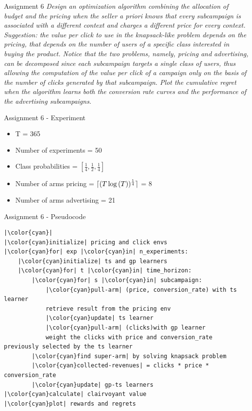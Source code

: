 \documentclass[11pt]{beamer}
\DeclarePairedDelimiter{\ceil}{\lceil}{\rceil}
\begin{document}
\begin{frame}{Assignment 6}
\textit{Design an optimization algorithm combining the allocation of budget and the pricing when the seller a priori knows that every subcampaign is associated with a different context and charges a different price for every context. Suggestion: the value per click to use in the knapsack-like problem depends on the pricing, that depends on the number of users of a specific class interested in buying the product. Notice that the two problems, namely, pricing and advertising, can be decomposed since each subcampaign targets a single class of users, thus allowing the computation of the value per click of a campaign only on the basis of the number of clicks generated by that subcampaign. Plot the cumulative regret when the algorithm learns both the conversion rate curves and the performance of the advertising subcampaigns.}
\end{frame}

\begin{frame}{Assignment 6 - Experiment}
\begin{itemize}
\item T = 365
\item Number of experiments = 50
\item Class probabilities = \( \left[ \frac{1}{4}, \frac{1}{2}, \frac{1}{4} \right] \)
\item Number of arms pricing = $\ceil{(T \log{(T)})^{\frac{1}{4}}}$ = 8
\item Number of arms advertising = 21
\end{itemize}
\end{frame}

\begin{frame}[fragile]{Assignment 6 - Pseudocode}
\begin{lstlisting}
|\color{cyan}|
|\color{cyan}initialize| pricing and click envs
|\color{cyan}for| exp |\color{cyan}in| n_experiments:
	|\color{cyan}initialize| ts and gp learners 
	|\color{cyan}for| t |\color{cyan}in| time_horizon:
		|\color{cyan}for| s |\color{cyan}in| subcampaign:
			|\color{cyan}pull-arm| (price, conversion_rate) with ts learner
			retrieve result from the pricing env
			|\color{cyan}update| ts learner
			|\color{cyan}pull-arm| (clicks)with gp learner
			weight the clicks with price and conversion_rate	previously selected by the ts learner
		|\color{cyan}find super-arm| by solving knapsack problem
		|\color{cyan}collected-revenues| = clicks * price * conversion_rate
		|\color{cyan}update| gp-ts learners 
|\color{cyan}calculate| clairvoyant value
|\color{cyan}plot| rewards and regrets
\end{lstlisting}
\end{frame}
\end{document}
